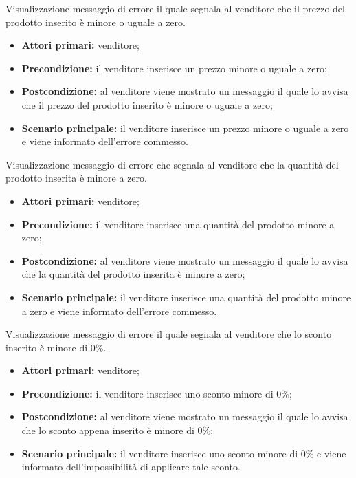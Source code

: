 \label{estensione:prezzo-minore-o-uguale-zero}

Visualizzazione messaggio di errore il quale segnala al venditore che il prezzo del prodotto inserito è minore o uguale a zero.
\begin{itemize}
    \item \textbf{Attori primari:} venditore;
    \item \textbf{Precondizione:} il venditore inserisce un prezzo minore o uguale a zero;
    \item \textbf{Postcondizione:} al venditore viene mostrato un messaggio il quale lo avvisa che il prezzo del prodotto inserito è minore o uguale a zero;
    \item \textbf{Scenario principale:} il venditore inserisce un prezzo minore o uguale a zero e viene informato dell'errore commesso.
\end{itemize}

\label{estensione:quantita-minore-a-zero}

Visualizzazione messaggio di errore che segnala al venditore che la quantità del prodotto inserita è minore a zero.
\begin{itemize}
    \item \textbf{Attori primari:} venditore;
    \item \textbf{Precondizione:} il venditore inserisce una quantità del prodotto minore a zero;
    \item \textbf{Postcondizione:} al venditore viene mostrato un messaggio il quale lo avvisa che la quantità del prodotto inserita è minore a zero;
    \item \textbf{Scenario principale:} il venditore inserisce una quantità del prodotto minore a zero e viene informato dell'errore commesso.
\end{itemize}

\label{estensione:sconto-minore-zero}

Visualizzazione messaggio di errore il quale segnala al venditore che lo sconto inserito è minore di 0\%.
\begin{itemize}
    \item \textbf{Attori primari:} venditore;
    \item \textbf{Precondizione:} il venditore inserisce uno sconto minore di 0\%;
    \item \textbf{Postcondizione:} al venditore viene mostrato un messaggio il quale lo avvisa che lo sconto appena inserito è minore di 0\%;
    \item \textbf{Scenario principale:} il venditore inserisce uno sconto minore di 0\% e viene informato dell'impossibilità di applicare tale sconto.
\end{itemize}

